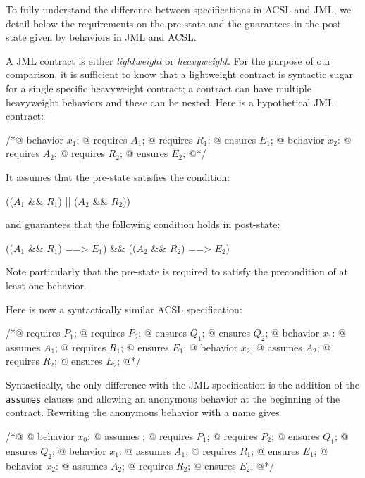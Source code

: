 To fully understand the difference between specifications in ACSL and
JML, we detail below the requirements on the pre-state and
the guarantees in the post-state given by behaviors in JML and ACSL.

A JML contract is either \emph{lightweight} or \emph{heavyweight}.
For the purpose of our comparison, it is sufficient to know that a
lightweight contract is syntactic sugar for a single specific 
heavyweight contract; a contract can have multiple heavyweight behaviors and these can be nested.
Here is a hypothetical JML contract:
\begin{listing}{1}
/*@ behavior $x_1$:
  @   requires $A_1$;
  @   requires $R_1$;
  @   ensures $E_1$;
  @ behavior $x_2$:
  @   requires $A_2$;
  @   requires $R_2$;
  @   ensures $E_2$;
  @*/
\end{listing}
It assumes that the pre-state satisfies the condition:
\begin{listing-nonumber}
(($A_1$ && $R_1$) || ($A_2$ && $R_2$))
\end{listing-nonumber}
and guarantees that the following condition holds in post-state:
\begin{listing-nonumber}
  (\old($A_1$ && $R_1$) ==> $E_1$) && (\old($A_2$ && $R_2$) ==> $E_2$)
\end{listing-nonumber}
Note particularly that the pre-state is required to satisfy
the precondition of at least one behavior.

Here is now a syntactically similar ACSL specification:

\begin{listing}{1}
/*@ requires $P_1$;
  @ requires $P_2$;
  @ ensures  $Q_1$;
  @ ensures  $Q_2$;
  @ behavior $x_1$:
  @   assumes $A_1$;
  @   requires $R_1$;
  @   ensures $E_1$;
  @ behavior $x_2$:
  @   assumes $A_2$;
  @   requires $R_2$;
  @   ensures $E_2$;
  @*/
\end{listing}

\noindent
Syntactically, the only difference with the JML specification is the
addition of the \lstinline|assumes| clauses and allowing an 
anonymous behavior at the beginning of the contract. Rewriting the anonymous behavior with a name gives

\begin{listing}{1}
	/*@ 
	@ behavior $x_0$:
	@   assumes \true;
	@   requires $P_1$;
	@   requires $P_2$;
	@   ensures  $Q_1$;
	@   ensures  $Q_2$;
	@ behavior $x_1$:
	@   assumes $A_1$;
	@   requires $R_1$;
	@   ensures $E_1$;
	@ behavior $x_2$:
	@   assumes $A_2$;
	@   requires $R_2$;
	@   ensures $E_2$;
	@*/
\end{listing}

